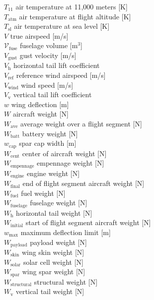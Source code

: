 \documentclass[]{aiaa-tc}%
\begin{document}
\begin{multicols}{2}
\begin{tabbing}
$T_{11}$ \> air temperature at 11,000 meters [K] \\
$T_{\text{atm}}$ \> air temperature at flight altitude [K] \\
$T_{\text{sl}}$ \> air temperature at sea level [K] \\
$V$ \> true airspeed [m/s] \\
$\mathcal{V}_{\text{fuse}}$ \>  fuselage volume [m$^3$] \\
$V_{\text{gust}}$ \>  gust velocity [m/s] \\
$V_{\text{h}}$ \> horizontal tail lift coefficient \\
$V_{\text{ref}}$ \>  reference wind airspeed [m/s] \\
$V_{\text{wind}}$ \>  wind speed [m/s] \\
$V_{\text{v}}$ \> vertical tail lift coefficient \\
$w$ \> wing deflection [m] \\
$W$ \> aircraft weight [N] \\
$W_{\text{ave}}$ \> average weight over a flight segment [N] \\
$W_{\text{batt}}$ \> battery weight [N] \\
$w_{\text{cap}}$ \> spar cap width [m] \\
$W_{\text{cent}}$ \> center of aircraft weight [N] \\
$W_{\text{empennage}}$ \> empennage weight [N] \\
$W_{\text{engine}}$ \> engine weight [N] \\
$W_{\text{final}}$ \> end of flight segment aircraft weight [N] \\
$W_{\text{fuel}}$ \> fuel weight [N] \\
$W_{\text{fuselage}}$ \> fuselage weight [N] \\
$W_{\text{h}}$ \> horizontal tail weight [N] \\
$W_{\text{initial}}$ \> start of flight segment aircraft weight [N] \\
$w_{\text{max}}$ \> maximum deflection limit [m] \\
$W_{\text{payload}}$ \> payload weight [N] \\
$W_{\text{skin}}$ \> wing skin weight [N] \\
$W_{\text{solar}}$ \> solar cell weight [N] \\
$W_{\text{spar}}$ \> wing spar weight [N] \\
$W_{\text{structural}}$ \> structural weight [N] \\
$W_{\text{v}}$ \> vertical tail weight [N] \\

\end{tabbing}
\end{multicols}
\end{document}
